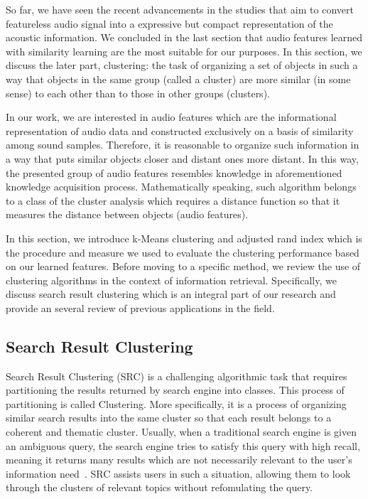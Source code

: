 So far, we have seen the recent advancements in the studies that aim to convert featureless audio signal into a expressive but compact representation of the acoustic information. We concluded in the last section that audio features learned with similarity learning are the most suitable for our purposes. In this section, we discuss the later part, clustering: the task of organizing a set of objects in such a way that objects in the same group (called a cluster) are more similar (in some sense) to each other than to those in other groups (clusters).

In our work, we are interested in audio features which are the informational representation of audio data and constructed exclusively on a basis of similarity among sound samples. Therefore, it is reasonable to organize such information in a way that puts similar objects closer and distant ones more distant. In this way, the presented group of audio features resembles knowledge in aforementioned knowledge acquisition process. Mathematically speaking, such algorithm belongs to a class of the cluster analysis which requires a distance function so that it measures the distance between objects (audio features).

In this section, we introduce k-Means clustering and adjusted rand index which is the procedure and measure we used to evaluate the clustering performance based on our learned features. Before moving to a specific method, we review the use of clustering algorithms in the context of information retrieval. Specifically, we discuss search result clustering which is an integral part of our research and provide an several review of previous applications in the field.

\subsection{Search Result Clustering}
Search Result Clustering (SRC) is a challenging algorithmic task that requires partitioning the results returned by search engine into classes. This process of partitioning is called Clustering. More specifically, it is a process of organizing similar search results into the same cluster so that each result belongs to a coherent and thematic cluster. Usually, when a traditional search engine is given an ambiguous query, the search engine tries to satisfy this query with high recall, meaning it returns many results which are not necessarily relevant to the user's information need~\cite{ugo2012}. SRC assists users in such a situation, allowing them to look through the clusters of relevant topics without refomulating the query.

